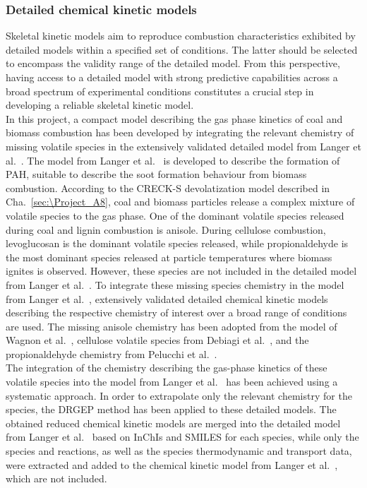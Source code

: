 \begin{refsection}
\subsubsection{Detailed chemical kinetic models}
Skeletal kinetic models aim to reproduce combustion characteristics exhibited by detailed models within a specified set of conditions. The latter should be selected to encompass the validity range of the detailed model. From this perspective, having access to a detailed model with strong predictive capabilities across a broad spectrum of experimental conditions constitutes a crucial step in developing a reliable skeletal kinetic model.
\\
In this project, a compact model describing the gas phase kinetics of coal and biomass combustion has been developed by integrating the relevant chemistry of missing volatile species in the extensively validated detailed model from Langer et al.~\cite{Langer2023}. The model from Langer et al.~\cite{Langer2023} is developed to describe the formation of PAH, suitable to describe the soot formation behaviour from biomass combustion. According to the CRECK-S devolatization model described in Cha.~\ref{sec:\Project_A8}, coal and biomass particles release a complex mixture of volatile species to the gas phase. One of the dominant volatile species released during coal and lignin combustion is anisole. During cellulose combustion, levoglucosan is the dominant volatile species released, while propionaldehyde is the most dominant species released at particle temperatures where biomass ignites is observed. However, these species are not included in the detailed model from Langer et al.~\cite{Langer2023}. To integrate these missing species chemistry in the model from Langer et al.~\cite{Langer2023}, extensively validated detailed chemical kinetic models describing the respective chemistry of interest over a broad range of conditions are used. The missing anisole chemistry has been adopted from the model of Wagnon et al.~\cite{Wagnon2018}, cellulose volatile species from Debiagi et al.~\cite{Debiagi2016}, and the propionaldehyde chemistry from Pelucchi et al.~\cite{Pelucchi2015}.
\\
The integration of the chemistry describing the gas-phase kinetics of these volatile species into the model from Langer et al.~\cite{Langer2023} has been achieved using a systematic approach. In order to extrapolate only the relevant chemistry for the species, the DRGEP method has been applied to these detailed models. The obtained reduced chemical kinetic models are merged into the detailed model from Langer et al.~\cite{Langer2023} based on InChIs and SMILES for each species, while only the species and reactions, as well as the species thermodynamic and transport data, were extracted and added to the chemical kinetic model from Langer et al.~\cite{Langer2023}, which are not included.

\end{refsection}
